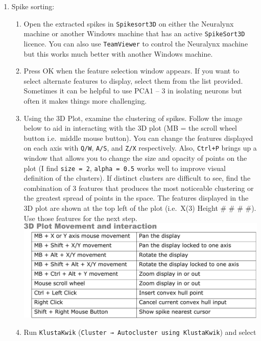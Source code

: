 \documentclass[
]{book}
\begin{document}
\begin{enumerate}
\def\labelenumi{\arabic{enumi}.}
\setcounter{enumi}{4}
\item
  Spike sorting:

  \begin{enumerate}
  \def\labelenumii{\arabic{enumii}.}
  \item
    Open the extracted spikes in \texttt{Spikesort3D} on either the Neuralynx
    machine or another Windows machine that has an active \texttt{SpikeSort3D}
    licence. You can also use \texttt{TeamViewer} to control the Neuralynx machine
    but this works much better with another Windows machine.
  \item
    Press OK when the feature selection window appears. If you want to
    select alternate features to display, select them from the list
    provided. Sometimes it can be helpful to use PCA1 -- 3 in isolating
    neurons but often it makes things more challenging.
  \item
    Using the 3D Plot, examine the clustering of spikes. Follow the image
    below to aid in interacting with the 3D plot (MB = the scroll wheel
    button i.e.~middle mouse button). You can change the features displayed
    on each axis with \texttt{Q/W}, \texttt{A/S}, and \texttt{Z/X} respectively. Also, \texttt{Ctrl+P}
    brings up a window that allows you to change the size and opacity of
    points on the plot (I find \texttt{size\ =\ 2}, \texttt{alpha\ =\ 0.5} works well to
    improve visual definition of the clusters). If distinct clusters are
    difficult to see, find the combination of 3 features that produces the
    most noticeable clustering or the greatest spread of points in the
    space. The features displayed in the 3D plot are shown at the top left
    of the plot (i.e.~X(3) Height \# \# \# \#). Use those features for the
    next step. \includegraphics{source_images/sec3.2.3_3d_plot_movement.png}
  \item
    Run \texttt{KlustaKwik} (\texttt{Cluster\ →\ Autocluster\ using\ KlustaKwik}) and select

\end{enumerate}
\end{enumerate}
\end{document}
